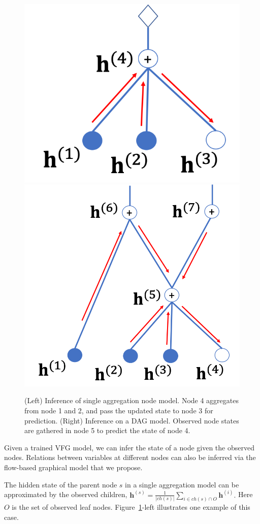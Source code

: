 \documentclass{article} %
\newcommand{\belhal}[1]{{\color{red}{\bf\sf [BK: #1]}}}
\begin{document}
\begin{figure}
\vspace{-0.3in}
\begin{center}
 \includegraphics[width=0.4\linewidth]{fig/two_layer_infer.png}
 \hspace{0.15in}
 \includegraphics[width=0.5\linewidth]{fig/dag_infer.png}
\end{center}
\vspace{-0.2in}
 \caption{{\small (Left) Inference of single aggregation node model. Node 4 aggregates from node 1 and 2, and  pass the updated state to node 3 for prediction. (Right) Inference on a DAG model. Observed node states are gathered in node 5 to predict the state of node 4.}}
\label{fig:two_layer_infer}
\vspace{-0.1in}
\end{figure}
Given a trained VFG model, we can infer the state of a node given the observed nodes. 
Relations between variables at different nodes can also be inferred via the flow-based graphical model that we propose. 



The hidden state of the parent node $s$ in a single aggregation model can be approximated by the observed children,
$\mathbf{h}^{(s)}  = \frac{1}{|ch(s)|}\sum_{i \in ch(s) \cap O} \mathbf{h}^{(i)} .$
Here $O$ is the set of observed leaf nodes. Figure~\ref{fig:two_layer_infer}-left illustrates one example of this case. 
\end{document}
